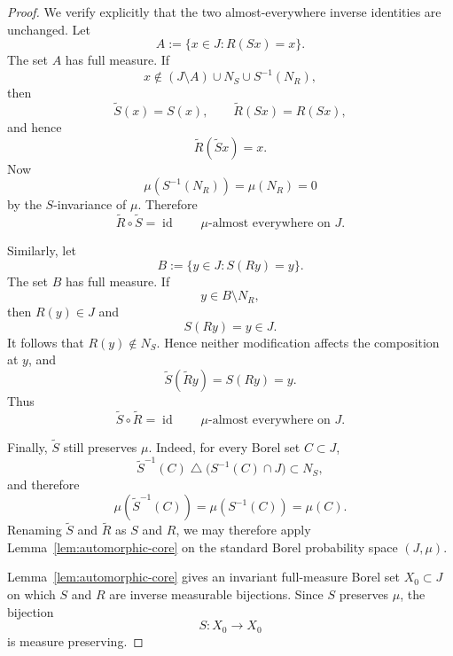 \documentclass[10pt,a4paper]{amsart}
\begin{document}
\begin{proof}
We verify explicitly that the two almost-everywhere inverse identities
are unchanged. Let
\[
        A
        :=
        \{x\in J:R(Sx)=x\}.
\]
The set \(A\) has full measure. If
\[
        x\notin
        (J\setminus A)\cup N_S\cup S^{-1}(N_R),
\]
then
\[
        \widetilde S(x)=S(x),
        \qquad
        \widetilde R(Sx)=R(Sx),
\]
and hence
\[
        \widetilde R(\widetilde Sx)=x.
\]
Now
\[
        \mu(S^{-1}(N_R))=\mu(N_R)=0
\]
by the \(S\)-invariance of \(\mu\). Therefore
\[
        \widetilde R\circ\widetilde S
        =
        \operatorname{id}
        \qquad
        \mu\text{-almost everywhere on }J.
\]

Similarly, let
\[
        B
        :=
        \{y\in J:S(Ry)=y\}.
\]
The set \(B\) has full measure. If
\[
        y\in B\setminus N_R,
\]
then \(R(y)\in J\) and
\[
        S(Ry)=y\in J.
\]
It follows that \(R(y)\notin N_S\). Hence neither modification affects
the composition at \(y\), and
\[
        \widetilde S(\widetilde Ry)
        =
        S(Ry)
        =
        y.
\]
Thus
\[
        \widetilde S\circ\widetilde R
        =
        \operatorname{id}
        \qquad
        \mu\text{-almost everywhere on }J.
\]

Finally, \(\widetilde S\) still preserves \(\mu\). Indeed, for every
Borel set \(C\subset J\),
\[
        \widetilde S^{-1}(C)
        \mathbin{\triangle}
        \bigl(S^{-1}(C)\cap J\bigr)
        \subset N_S,
\]
and therefore
\[
        \mu(\widetilde S^{-1}(C))
        =
        \mu(S^{-1}(C))
        =
        \mu(C).
\]
Renaming \(\widetilde S\) and \(\widetilde R\) as \(S\) and \(R\), we
may therefore apply Lemma~\ref{lem:automorphic-core} on the standard
Borel probability space \((J,\mu)\).

Lemma~\ref{lem:automorphic-core} gives an invariant full-measure Borel
set \(X_0\subset J\) on which \(S\) and \(R\) are inverse measurable
bijections. Since \(S\) preserves \(\mu\), the bijection
\[
        S:X_0\longrightarrow X_0
\]
is measure preserving.
\end{proof}
\end{document}
